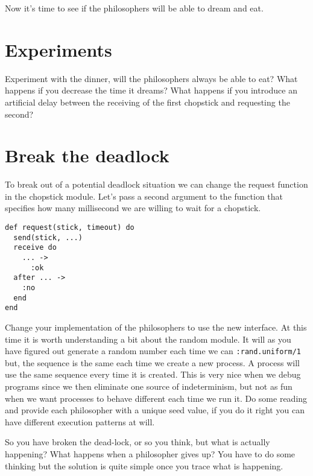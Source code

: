 \documentclass[a4paper,11pt]{article}
\begin{document}
Now it's time to see if the philosophers will be able to dream and eat. 



\section{Experiments}

Experiment with the dinner, will the philosophers always be able to
eat? What happens if you decrease the time it dreams? What happens if
you introduce an artificial delay between the receiving of the first
chopstick and requesting the second?



\section{Break the deadlock}

To break out of a potential deadlock situation we can change the
request function in the chopstick module. Let's pass a second argument
to the function that specifies how many millisecond we are willing to
wait for a chopstick.

\pagebreak

\begin{verbatim}
def request(stick, timeout) do
  send(stick, ...)
  receive do
    ... -> 
      :ok
  after ... -> 
    :no
  end
end
\end{verbatim}

Change your implementation of the philosophers to use the new
interface. At this time it is worth understanding a bit about the
random module. It will as you have figured out generate a random
number each time we can {\tt :rand.uniform/1} but, the sequence is 
the same each
time we create a new process. A process will use the same sequence
every time it is created. This is very nice when we debug programs
since we then eliminate one source of indeterminism, but not as fun
when we want processes to behave different each time we run it. Do
some reading and provide each philosopher with a unique seed value, if
you do it right you can have different execution patterns at will.

So you have broken the dead-lock, or so you think, but what is
actually happening? What happens when a philosopher gives up? You have
to do some thinking but the solution is quite simple once you trace
what is happening.
\end{document}
